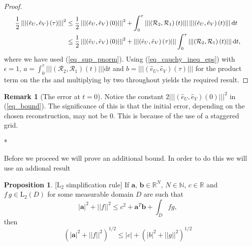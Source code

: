 \documentclass[12pt,a4paper]{article}
\numberwithin{equation}{section}
\theoremstyle{definition}
\newcommand{\pnorm}[1]{\left|\left|\left|#1\right|\right|\right|}
\newcommand{\norm}[1]{\left|#1\right|}
\newcommand{\Norm}[1]{\left|\left|#1\right|\right|}
\newcommand{\vect}[1]{\textbf{#1}}
\newcommand{\leb}{\text{L}}
\newcommand{\qp}[1]{\left(#1\right)}
\newtheorem{Proposition}[subsection]{Proposition}
\newtheorem{Rem}[subsection]{Remark}
\begin{document}
\begin{proof}
\begin{equation}
\small
\begin{aligned}
\frac{1}{2}\pnorm{\qp{\hat{e}_U, \hat{e}_V}\qp{\tau}}^2&\leq
\frac{1}{2}\pnorm{\qp{\hat{e}_U, \hat{e}_V}\qp{0}}^2
+\int_0^\tau\pnorm{\qp{\mathcal{R}_2,\mathcal{R}_1}\qp{t}} \pnorm{\qp{\hat{e}_U,\hat{e}_V}\qp{t}}\mathrm{d}t\\
&\leq \frac{1}{2}\pnorm{\qp{\hat{e}_U, \hat{e}_V}\qp{0}}^2
+\pnorm{\qp{\hat{e}_U,\hat{e}_V}\qp{\tau}}\int_0^\tau\pnorm{\qp{\mathcal{R}_2,\mathcal{R}_1}\qp{t}} \mathrm{d}t,
\end{aligned}
\end{equation}
where we have used (\ref{eq_sup_pnorm}).
Using (\ref{eq_cauchy_ineq_eps}) with $\epsilon=1$, $a=\int_0^\tau\pnorm{\qp{\mathcal{R}_2,\mathcal{R}_1}\qp{t}} \mathrm{d}t$ and $b=\pnorm{\qp{\hat{e}_U,\hat{e}_V}\qp{\tau}}$ for the product term on the rhs and multiplying by two throughout yields the required result.
\end{proof}

\begin{Rem}[The error at $t=0$]
	Notice the constant $2\pnorm{\qp{\hat{e}_U,\hat{e}_V}\qp{0}}^2$ in (\ref{eq_bound}).  The significance of this is that the initial error, depending on the chosen reconstruction, may not be $0$.  This is because of the use of a staggered grid.
\end{Rem}

\/*

Before we proceed we will prove an additional bound.  In order to do this we will use an addional result
\begin{Proposition}\label{lemma:L2_simplification}[$\leb_2$ simplification rule] If $\vect{a},\, \vect{b}\in \mathbb{R}^N,\, N\in \mathbb{N}$, $c\in \mathbb{R}$ and $f\,g \in \leb_2\qp{D}$ for some measurable domain $D$ are such that 
	\begin{equation*}
\norm{\vect{a}}^2 +\Norm{{f}}^2\leq c^2+\vect{a}^T\vect{b}+\int_D fg,
 	\end{equation*}
then
\begin{equation}
\qp{\norm{\vect{a}}^2 +\Norm{{f}}^2}^{1/2}\leq \norm{c}+\qp{\norm{{b}}^2+\Norm{g}^2}^{1/2}
\end{equation}
\end{Proposition}
\end{document}
